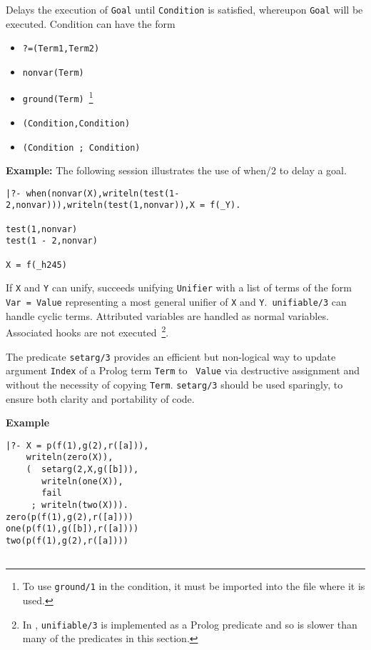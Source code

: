 \begin{description}
%
Delays the execution of {\tt Goal} until {\tt Condition} is satisfied,
whereupon {\tt Goal} will be executed.  Condition can have the form
\begin{itemize}
\item {\tt ?=(Term1,Term2)}
\item {\tt nonvar(Term)}
\item {\tt ground(Term)}~\footnote{To use {\tt ground/1} in the
condition, it must be imported into the file where it is used.}
\item {\tt (Condition,Condition)}
\item {\tt (Condition ; Condition)}
\end{itemize}

{\bf Example:} The following session illustrates the use of when/2 to
delay a goal.
%
\begin{small}
\begin{verbatim}
|?- when(nonvar(X),writeln(test(1-2,nonvar))),writeln(test(1,nonvar)),X = f(_Y).

test(1,nonvar)
test(1 - 2,nonvar)

X = f(_h245)
\end{verbatim}
\end{small}

%
If {\tt X} and {\tt Y} can unify, succeeds unifying {\tt Unifier} with
a list of terms of the form {\tt Var = Value} representing a most
general unifier of {\tt X} and {\tt Y}.\  {\tt unifiable/3} can handle
cyclic terms. Attributed variables are handled as normal
variables. Associated hooks are not executed~\footnote{In \version ,
  {\tt unifiable/3} is implemented as a Prolog predicate and so is slower
  than many of the predicates in this section.}.

%
The predicate {\tt setarg/3} provides an efficient but non-logical way
to update argument {\tt Index} of a Prolog term {\tt Term} to {\tt
  Value} via destructive assignment and without the necessity of
copying {\tt Term}.  {\tt setarg/3} should be used sparingly, to
ensure both clarity and portability of code.

{\bf Example}
{\small
\begin{verbatim}
|?- X = p(f(1),g(2),r([a])),
    writeln(zero(X)),
    (  setarg(2,X,g([b])),
       writeln(one(X)),
       fail
     ; writeln(two(X))).
zero(p(f(1),g(2),r([a])))
one(p(f(1),g([b]),r([a])))
two(p(f(1),g(2),r([a])))


\end{verbatim}}
\end{description}
